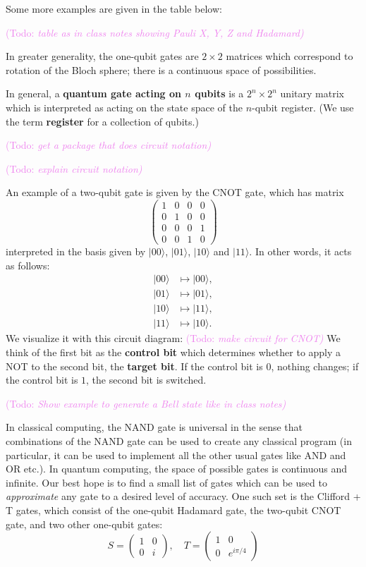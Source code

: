 \documentclass{article}
\theoremstyle{plain}
\theoremstyle{definition}
\theoremstyle{remark}
\numberwithin{theorem}{section}
\newcommand{\KS}[1]{\textcolor{violet}{{\sf (Todo:} {\sl{#1})}}}
\newcommand{\KS}[1]{}
\begin{document}
Some more examples are given in the table below:

\KS{table as in class notes showing Pauli X, Y, Z and Hadamard}


In greater generality, the one-qubit gates are $2 \times 2$ matrices which correspond to rotation of the Bloch sphere; there is a continuous space of possibilities.

In general, a \textbf{quantum gate acting on $n$ qubits} is a $2^n \times 2^n$ unitary matrix which is interpreted as acting on the state space of the $n$-qubit register.  (We use the term \textbf{register} for a collection of qubits.)

\KS{get a package that does circuit notation}

\KS{explain circuit notation}

An example of a two-qubit gate is given by the CNOT gate, which has matrix
\[
\begin{pmatrix}
1 & 0 & 0 & 0 \\
0 & 1 & 0 & 0 \\
0 & 0 & 0 & 1 \\
0 & 0 & 1 & 0
\end{pmatrix}
\]
interpreted in the basis given by $|00\rangle$, $|01\rangle$, $|10\rangle$ and $|11\rangle$.  In other words, it acts as follows:
\begin{align*}
|00\rangle &\mapsto |00 \rangle, \\
|01\rangle &\mapsto |01 \rangle,\\
|10\rangle &\mapsto |11 \rangle,\\
|11\rangle &\mapsto |10 \rangle.
\end{align*}
We visualize it with this circuit diagram:
\KS{make circuit for CNOT}
We think of the first bit as the \textbf{control bit} which determines whether to apply a NOT to the second bit, the \textbf{target bit}.  If the control bit is $0$, nothing changes; if the control bit is $1$, the second bit is switched.

\KS{Show example to generate a Bell state like in class notes}

In classical computing, the NAND gate is universal in the sense that combinations of the NAND gate can be used to create any classical program (in particular, it can be used to implement all the other usual gates like AND and OR etc.).  In quantum computing, the space of possible gates is continuous and infinite.  Our best hope is to find a small list of gates which can be used to \emph{approximate} any gate to a desired level of accuracy.  One such set is the Clifford + T gates, which consist of the one-qubit Hadamard gate, the two-qubit CNOT gate, and two other one-qubit gates:
\[
S = \begin{pmatrix}
1 & 0 \\ 0 & i
\end{pmatrix}, \quad
T = \begin{pmatrix}
1 & 0 \\ 0 & e^{i\pi/4} \end{pmatrix}
\]
\end{document}
